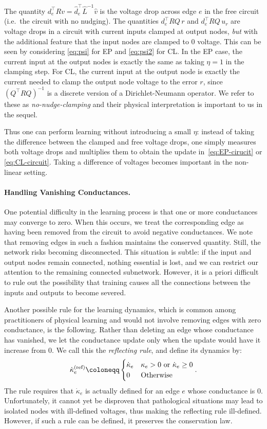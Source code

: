 \documentclass[final, 11pt, nonatbib]{elsarticle}
\theoremstyle{definition}
\theoremstyle{plain}
\numberwithin{equation}{section}
\begin{document}
The quantity $d_e^\top R v = \hat{d}_e^\top \hat{L}^{-1} \hat{v}$ is the voltage drop across edge $e$ in
the free circuit (i.e.\ the circuit with no nudging). The quantities
$d_e^\top RQ\,r$ and $d_e^\top RQ\,u_r$ are voltage drops in a
circuit with current inputs clamped at output nodes, \emph{but} with the additional feature that the input nodes are clamped to $0$ voltage. This can be seen by considering \eqref{eq:psi} for EP and \eqref{eq:psi2} for CL. In the EP case, the current input at the output nodes is exactly the same as taking $\eta =1$ in the clamping step. For CL, the current input at the output node is exactly the current needed to clamp the output node voltage to the error $r$, since $(Q^{\top} RQ)^{-1}$ is a discrete version of a Dirichlet-Neumann operator. We refer to these as \emph{no-nudge-clamping} and their physical interpretation is important to us in the sequel.

Thus one can perform learning without introducing a small
$\eta$: instead of taking the difference between the clamped and free voltage
drops, one simply measures both voltage drops and multiplies them to obtain the update in~\eqref{eq:EP-cirucit} or
\eqref{eq:CL-circuit}. Taking a difference of voltages becomes important in the non-linear setting.



\paragraph{Handling Vanishing Conductances.} One potential difficulty in the learning process is that one or more
conductances may converge to zero. When this occurs, we treat the corresponding edge as having been removed from the circuit to avoid negative conductances. We note that removing edges in such a fashion maintains the conserved quantity. Still, the network risks becoming
disconnected.  This situation is subtle: if the input and output nodes remain
connected, nothing essential is lost, and we can restrict our attention to the
remaining connected subnetwork.  However, it is a priori difficult to rule out
the possibility that training causes all the connections between the inputs and outputs to become severed.


Another possible rule for the learning dynamics, which is common among practitioners of physical learning and would not involve removing edges with zero conductance, is the following. Rather than deleting an edge whose conductance has vanished, we let the conductance update only when the update would have it increase from $0$. We call this the \textit{reflecting rule}, and define its dynamics by:
\[ \dot{\kappa}^{\rm (ref)}_{e} \coloneqq \begin{cases}
\dot{\kappa}_e & \kappa_e>0 \ \text{or} \ \dot{\kappa}_e\geq 0
\\
0 & \text{Otherwise}
\end{cases}.\]
The rule requires that $\dot{\kappa}_e$ is actually defined for an edge $e$ whose conductance is $0.$ Unfortunately, it cannot yet be disproven that pathological situations may lead to isolated nodes with ill-defined voltages, thus making the reflecting rule ill-defined. However, if such a rule can be defined, it preserves the conservation law.
\end{document}
